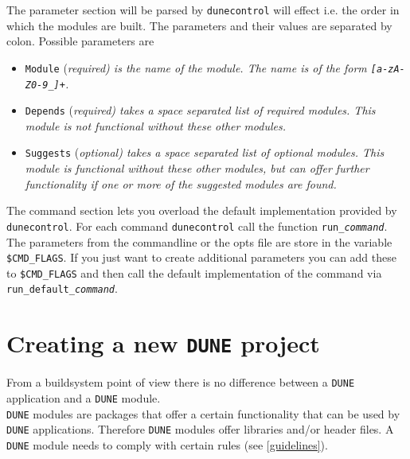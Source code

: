 \documentclass[11pt,a4paper,headinclude,footinclude,DIV16,normalheadings]{scrartcl}
\newcommand{\dune}{\texttt{DUNE}\xspace}
\newcommand{\dunecontrol}{\texttt{dunecontrol}\xspace}
\begin{document}
The parameter section will be parsed by \dunecontrol will effect
i.e. the order in which the modules are built. The parameters and
their values are separated by colon. Possible parameters are
\begin{itemize}
\item \texttt{Module} (\em required\em) is the name of the module. The
  name is of the form \texttt{[a-zA-Z0-9\_]+}.
\item \texttt{Depends} (\em required\em) takes a space separated list
  of required modules. This module is not functional without these
  other modules.
\item \texttt{Suggests} (\em optional\em) takes a space separated list
  of optional modules. This module is functional without these
  other modules, but can offer further functionality if one or more of
  the suggested modules are found.
\end{itemize}

The command section lets you overload the default implementation
provided by \dunecontrol. For each command \dunecontrol call the
function \texttt{run\_\textit{command}}. The parameters from the
commandline or the opts file are store in the variable
\texttt{\$CMD\_FLAGS}. If you just want to create additional parameters
you can add these to \texttt{\$CMD\_FLAGS} and then call the default
implementation of the command via
\texttt{run\_default\_\textit{command}}.

\section{Creating a new \dune project}\label{section::creating_new_dune_project}

From a buildsystem point of view there is no difference between a \dune
application and a \dune module.\\

\dune modules are packages that offer a certain functionality that can
be used by \dune applications. Therefore \dune modules offer libraries
and/or header files. A \dune module needs to comply with certain rules
(see \ref{guidelines}).
\end{document}
